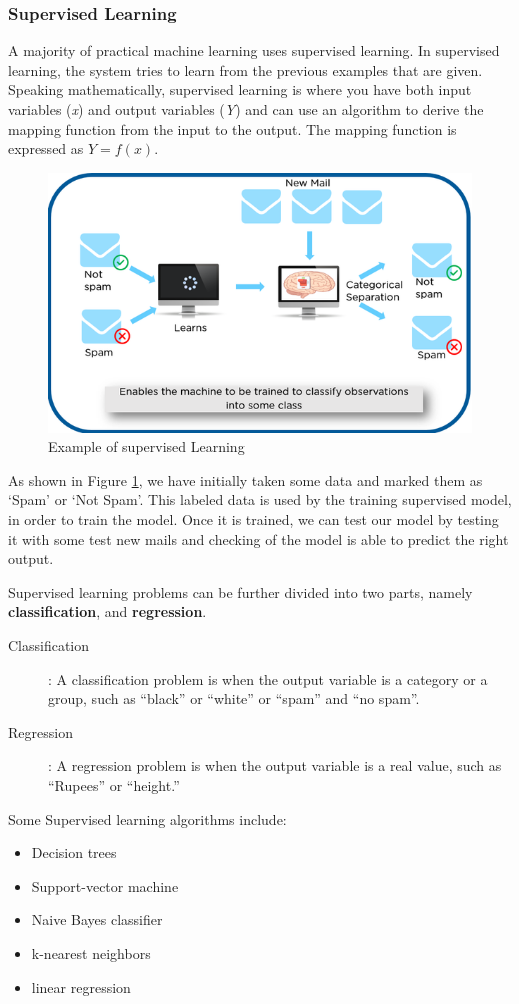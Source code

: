 \documentclass{report}
\begin{document}
\subsubsection{Supervised Learning}
A majority of practical machine learning uses supervised learning. In supervised learning, the system tries to learn from the previous examples that are given. Speaking mathematically, supervised learning is where you have both input variables (\textit{x}) and output variables (\textit{Y}) and can use an algorithm to derive the mapping function from the input to the output. The mapping function is expressed as
$Y = f(x)$.
\begin{figure}[h]
  \centering
  \includegraphics[scale=0.3]{supervised_leaning_example2}
  \caption{Example of supervised Learning}
  \label{fig:supervised_learning_example}
\end{figure}

As shown in Figure \ref{fig:supervised_learning_example}, we have initially taken some data and marked them as ‘Spam’ or ‘Not Spam’. This
labeled data is used by the training supervised model, in order to train the model. Once it is trained, we can test our model by testing it with some test new mails and checking of the model is able to predict the right output. 

Supervised learning problems can be further divided into two parts, namely \textbf{classification}, and \textbf{regression}.
\begin{description}
\item[ Classification] : A classification problem is when the output variable is a category or a group, such as “black” or “white” or “spam” and “no spam”.
\item[ Regression ] :  A regression problem is when the output variable is a real value, such as “Rupees” or “height.”
\end{description}
Some Supervised learning algorithms include:
\begin{itemize}
\item Decision trees
\item Support-vector machine
\item Naive Bayes classifier
\item k-nearest neighbors
\item linear regression
\end{itemize}
\end{document}
